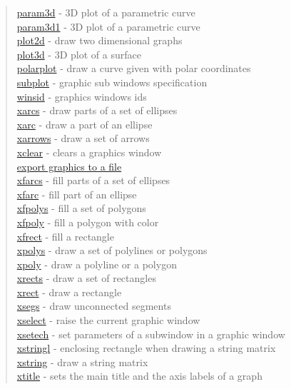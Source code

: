 \begin{quote}
\hyperlink{param3d}{param3d} - 3D plot of a parametric curve\\
\hyperlink{param3d1}{param3d1} - 3D plot of a parametric curve\\
\hyperlink{plot2d}{plot2d} - draw two dimensional graphs\\
\hyperlink{plot3d}{plot3d} - 3D plot of a surface \\
\hyperlink{polarplot}{polarplot} - draw a curve given with polar coordinates \\
\hyperlink{subplot}{subplot} - graphic sub windows specification\\
\hyperlink{winsid}{winsid} - graphics windows ids\\
\hyperlink{xarcs}{xarcs} - draw parts of a set of ellipses \\
\hyperlink{xarc}{xarc} - draw a part of an ellipse\\
\hyperlink{xarrows}{xarrows} - draw a set of arrows \\
\hyperlink{xclear}{xclear} - clears a graphics window \\
\hyperlink{xexport}{export graphics to a file}\\
\hyperlink{xfarcs}{xfarcs} - fill parts of a set of ellipses \\
\hyperlink{xfarc}{xfarc} - fill part of an ellipse\\
\hyperlink{xfpolys}{xfpolys} - fill a set of polygons \\
\hyperlink{xfpoly}{xfpoly} - fill a polygon with color \\
\hyperlink{xfrect}{xfrect} - fill a rectangle \\
\hyperlink{xpolys}{xpolys} - draw a set of polylines or polygons \\
\hyperlink{xpoly}{xpoly} - draw a polyline or a polygon \\
\hyperlink{xrects}{xrects} - draw a set of rectangles\\
\hyperlink{xrect}{xrect} - draw a rectangle\\
\hyperlink{xsegs}{xsegs} - draw unconnected segments \\
\hyperlink{xselect}{xselect} - raise the current graphic window\\
\hyperlink{xsetech}{xsetech} - set parameters of a subwindow in a graphic window\\
\hyperlink{xstringl}{xstringl} - enclosing rectangle when drawing a string matrix \\
\hyperlink{xstring}{xstring} - draw a string matrix \\
\hyperlink{xtitle}{xtitle} - sets the main title and the axis labels of a graph\\
\end{quote}


